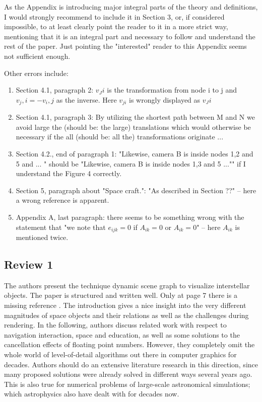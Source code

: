 \documentclass{article}
\newcommand{\concernref}[1]{\textit{\color{red}{(#1)}}}
\begin{document}
As the Appendix is introducing major integral parts of the theory and definitions, I would strongly recommend to include it in Section 3, or, if considered impossible, to at least clearly point the reader to it in a more strict way, mentioning that it is an integral part and necessary to follow and understand the rest of the paper.
Just pointing the "interested" reader to this Appendix seems not sufficient enough.

Other errors include:

\begin{enumerate}
\item Section 4.1, paragraph 2: $v_Ji$ is the transformation from node i to j and $v_j,i=-v_i,j$ as the inverse.
Here $v_{ji}$ is wrongly displayed as $v_Ji$
\item Section 4.1, paragraph 3: By utilizing the shortest path between M and N we avoid large the (should be: the large) translations which would otherwise be necessary if the all (should be: all the) transformations originate ...
\item Section 4.2., end of paragraph 1: "Likewise, camera B is inside nodes 1,2 and 5 and ...
" should be "Likewise, camera B is inside nodes 1,3 and 5 ..."" if I understand the Figure 4 correctly.
\item Section 5, paragraph about "Space craft.": "As described in Section ??" -- here a wrong reference is apparent.
\item Appendix A, last paragraph: there seems to be something wrong with the statement that "we note that $e_{ijk}=0$ if $A_{ik}=0$ or $A_{ik}=0$" -- here $A_{ik}$ is mentioned twice.
\end{enumerate}

\concernref{These errors have been addressed, see \ref{concern:typos}.}

\subsection*{Review 1}

The authors present the technique dynamic scene graph to visualize interstellar objects.
The paper is structured and written well.
Only at page 7 there is a missing reference \concernref{See \ref{concern:typos}}.
The introduction gives a nice insight into the very different magnitudes of space objects and their relations as well as the challenges during rendering.
In the following, authors discuss related work with respect to navigation interaction, space and education, as well as some solutions to the cancellation effects of floating point numbers.
However, they completely omit the whole world of level-of-detail algorithms out there in computer graphics for decades.
Authors should do an extensive literature research in this direction, since many proposed solutions were already solved in different ways several years ago. 
This is also true for numerical problems of large-scale astronomical simulations; which astrophysics also have dealt with for decades now. 
\concernref{See \ref{concern:comparisons}.}
\end{document}

